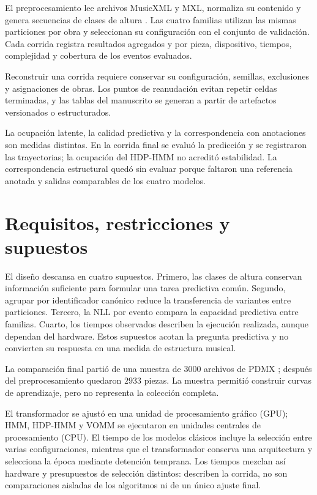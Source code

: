 El preprocesamiento lee archivos MusicXML y MXL, normaliza su contenido y genera secuencias de clases de altura \cite{musicxml2021}. Las cuatro familias utilizan las mismas particiones por obra y seleccionan su configuración con el conjunto de validación. Cada corrida registra resultados agregados y por pieza, dispositivo, tiempos, complejidad y cobertura de los eventos evaluados.

Reconstruir una corrida requiere conservar su configuración, semillas, exclusiones y asignaciones de obras. Los puntos de reanudación evitan repetir celdas terminadas, y las tablas del manuscrito se generan a partir de artefactos versionados o estructurados.

La ocupación latente, la calidad predictiva y la correspondencia con anotaciones son medidas distintas. En la corrida final se evaluó la predicción y se registraron las trayectorias; la ocupación del HDP-HMM no acreditó estabilidad. La correspondencia estructural quedó sin evaluar porque faltaron una referencia anotada y salidas comparables de los cuatro modelos.

\section{Requisitos, restricciones y supuestos}

El diseño descansa en cuatro supuestos. Primero, las clases de altura conservan información suficiente para formular una tarea predictiva común. Segundo, agrupar por identificador canónico reduce la transferencia de variantes entre particiones. Tercero, la NLL por evento compara la capacidad predictiva entre familias. Cuarto, los tiempos observados describen la ejecución realizada, aunque dependan del hardware. Estos supuestos acotan la pregunta predictiva y no convierten su respuesta en una medida de estructura musical.

La comparación final partió de una muestra de $3000$ archivos de PDMX \cite{long2024pdmx}; después del preprocesamiento quedaron $2933$ piezas. La muestra permitió construir curvas de aprendizaje, pero no representa la colección completa.

El transformador se ajustó en una unidad de procesamiento gráfico (GPU); HMM, HDP-HMM y VOMM se ejecutaron en unidades centrales de procesamiento (CPU). El tiempo de los modelos clásicos incluye la selección entre varias configuraciones, mientras que el transformador conserva una arquitectura y selecciona la época mediante detención temprana. Los tiempos mezclan así hardware y presupuestos de selección distintos: describen la corrida, no son comparaciones aisladas de los algoritmos ni de un único ajuste final.

